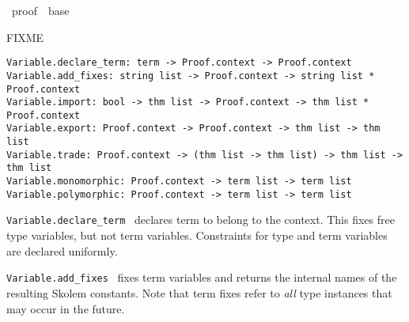 %
\begin{isabellebody}%
\def\isabellecontext{proof}%
%
\isadelimtheory
\isanewline
\isanewline
\isanewline
%
\endisadelimtheory
%
\isatagtheory
{}\isamarkupfalse%
\ {\isachardoublequoteopen}proof{\isachardoublequoteclose}\ \ base\ %
\endisatagtheory
{\isafoldtheory}%
%
\isadelimtheory
%
\endisadelimtheory
%
\isamarkuptrue%
%
\isamarkuptrue%
%
\isamarkuptrue%
%
\begin{isamarkuptext}%
FIXME%
\end{isamarkuptext}%
\isamarkuptrue%
%
\isadelimmlref
%
\endisadelimmlref
%
\isatagmlref
%
\begin{isamarkuptext}%
\begin{mldecls}
  \verb|Variable.declare_term: term -> Proof.context -> Proof.context| \\
  \verb|Variable.add_fixes: string list -> Proof.context -> string list * Proof.context| \\
  \verb|Variable.import: bool -> thm list -> Proof.context -> thm list * Proof.context| \\
  \verb|Variable.export: Proof.context -> Proof.context -> thm list -> thm list| \\
  \verb|Variable.trade: Proof.context -> (thm list -> thm list) -> thm list -> thm list| \\
  \verb|Variable.monomorphic: Proof.context -> term list -> term list| \\
  \verb|Variable.polymorphic: Proof.context -> term list -> term list| \\
  \end{mldecls}

  \begin{description}

  \item \verb|Variable.declare_term|~ declares term
   to belong to the context.  This fixes free type
  variables, but not term variables.  Constraints for type and term
  variables are declared uniformly.

  \item \verb|Variable.add_fixes|~ fixes term
  variables  and returns the internal names of the
  resulting Skolem constants.  Note that term fixes refer to
  \emph{all} type instances that may occur in the future.


\end{description}
\end{isamarkuptext}
\end{isabellebody}
